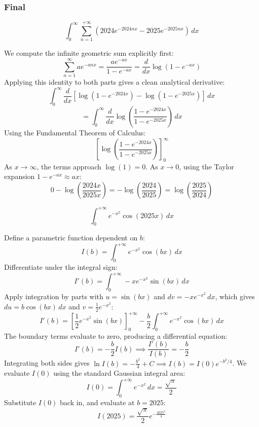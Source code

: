 \subsubsection*{Final}
\begin{questions}
    \question \[ \int_0^\infty \sum_{n=1}^{+\infty} \left(2024e^{-2024nx} - 2025e^{-2025nx}\right) \,dx \]
    \begin{solution}
        We compute the infinite geometric sum explicitly first:
        \[ \sum_{n=1}^\infty a e^{-anx} = \frac{a e^{-ax}}{1 - e^{-ax}} = \frac{d}{dx} \log(1 - e^{-ax}) \]
        Applying this identity to both parts gives a clean analytical derivative:
        \[ \int_0^\infty \frac{d}{dx} \left[ \log(1 - e^{-2024x}) - \log(1 - e^{-2025x}) \right] \,dx \]
        \[ = \int_0^\infty \frac{d}{dx} \log\left(\frac{1 - e^{-2024x}}{1 - e^{-2025x}}\right) \,dx \]
        Using the Fundamental Theorem of Calculus:
        \[ \left[ \log\left(\frac{1 - e^{-2024x}}{1 - e^{-2025x}}\right) \right]_0^\infty \]
        As $x \to \infty$, the terms approach $\log(1) = 0$. As $x \to 0$, using the Taylor expansion $1 - e^{-ax} \approx ax$:
        \[ 0 - \log\left(\frac{2024x}{2025x}\right) = -\log\left(\frac{2024}{2025}\right) = \log\left(\frac{2025}{2024}\right) \]
    \end{solution}

    \question \[ \int_0^{+\infty} e^{-x^2} \cos(2025 x) \,dx \]
    \begin{solution}
        Define a parametric function dependent on $b$:
        \[ I(b) = \int_0^{+\infty} e^{-x^2} \cos(bx) \,dx \]
        Differentiate under the integral sign:
        \[ I'(b) = \int_0^{+\infty} -x e^{-x^2} \sin(bx) \,dx \]
        Apply integration by parts with $u = \sin(bx)$ and $dv = -x e^{-x^2} \,dx$, which gives $du = b\cos(bx) \,dx$ and $v = \frac{1}{2}e^{-x^2}$:
        \[ I'(b) = \left[ \frac{1}{2} e^{-x^2} \sin(bx) \right]_0^{+\infty} - \frac{b}{2} \int_0^{+\infty} e^{-x^2} \cos(bx) \,dx \]
        The boundary terms evaluate to zero, producing a differential equation:
        \[ I'(b) = -\frac{b}{2} I(b) \implies \frac{I'(b)}{I(b)} = -\frac{b}{2} \]
        Integrating both sides gives $\ln I(b) = -\frac{b^2}{4} + C \implies I(b) = I(0) e^{-b^2/4}$. We evaluate $I(0)$ using the standard Gaussian integral area:
        \[ I(0) = \int_0^{+\infty} e^{-x^2} \,dx = \frac{\sqrt{\pi}}{2} \]
        Substitute $I(0)$ back in, and evaluate at $b = 2025$:
        \[ I(2025) = \frac{\sqrt{\pi}}{2} e^{-\frac{2025^2}{4}} \]
    \end{solution}


\end{questions}
